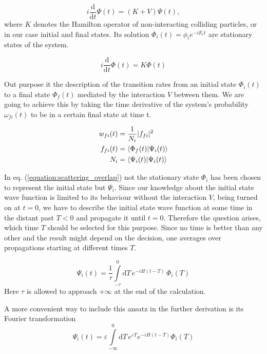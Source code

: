 \begin{equation}
  i \frac{\mathrm{d}}{\mathrm{d}t} \Psi(t) = (K + V) \Psi(t) ,
\end{equation}
where $K$ denotes the Hamilton operator of non-interacting colliding
particles, or in our case initial and final states. Its solution
$\Phi_i(t) = \phi_i e^{-iE_it}$ are stationary states of the system.

\begin{equation}
  i \frac{\mathrm{d}}{\mathrm{d}t} \Phi(t) = K \Phi(t)
\end{equation}

Out purpose it the description of the transition rates from an initial state
$\Phi_i(t)$ to a final state $\Phi_f(t)$ mediated by the interaction $V$ between
them. We are going to achieve this by taking the time derivative of the system's
probability $\omega_{fi}(t)$ to be in a certain final state at time t.

\begin{align}
  w_{fi}(t) &= \frac 1{N_i} |f_{fi}|^2 \\
  f_{fi}(t) &= \braket{\Phi_f(t)|\Psi_i(t)} \label{equation:scattering_overlap}\\
  N_i       &= \braket{\Psi_i(t)|\Psi_i(t)}
\end{align}

In eq. (\ref{equation:scattering_overlap}) not the stationary state $\Phi_i$
has been chosen to represent the initial state but $\Psi_i$. Since our knowledge
about the initial state wave function is limited to its behaviour without the
interaction $V$, being turned on at $t=0$, we have to describe the initial state
wave function at some time in the distant past $T<0$ and propagate it until $t=0$.
Therefore the question arises, which time $T$ should be selected for this purpose.
Since no time is better than any other and the result might depend on the decision,
one averages over propagations starting at different times $T$.

\begin{equation}
  \Psi_i(t) = \frac 1\tau \int\limits_{-\tau}^0 \mathrm{d}T \,
              e^{-iH(t-T)} \, \Phi_i(T)
\end{equation}
Here $\tau$ is allowed to approach $+\infty$ at the end of the calculation.

A more convenient way to include this ansatz in the further derivation
is its Fourier transformation
\begin{equation}
  \Psi_i(t) = \varepsilon \int\limits_{-\infty}^0 \mathrm{d}T \,
              e^{\varepsilon T} e^{-iH(t-T)} \Phi_i(T)
\end{equation}

